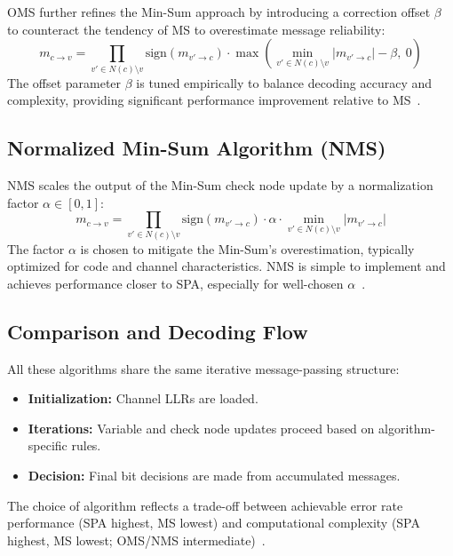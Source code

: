 \documentclass[../main.tex]{subfiles}
\begin{document}
OMS further refines the Min-Sum approach by introducing a correction offset $\beta$ to counteract the tendency of MS to overestimate message reliability:
\begin{equation}
    m_{c \to v} = \prod_{v' \in N(c) \setminus v} \mathrm{sign}(m_{v' \to c}) \cdot \max\left( \min_{v' \in N(c) \setminus v} |m_{v' \to c}| - \beta,\ 0 \right)
\end{equation}
The offset parameter $\beta$ is tuned empirically to balance decoding accuracy and complexity, providing significant performance improvement relative to MS~\cite{Condo2019}.


\subsection{Normalized Min-Sum Algorithm (NMS)}

NMS scales the output of the Min-Sum check node update by a normalization factor $\alpha \in [0,1]$:
\begin{equation}
    m_{c \to v} = \prod_{v' \in N(c) \setminus v} \mathrm{sign}(m_{v' \to c}) \cdot \alpha \cdot \min_{v' \in N(c) \setminus v} |m_{v' \to c}|
\end{equation}
The factor $\alpha$ is chosen to mitigate the Min-Sum’s overestimation, typically optimized for code and channel characteristics. NMS is simple to implement and achieves performance closer to SPA, especially for well-chosen $\alpha$~\cite{Schmalen2021, Condo2019}.


\subsection{Comparison and Decoding Flow}

All these algorithms share the same iterative message-passing structure:
\begin{itemize}
    \item \textbf{Initialization:} Channel LLRs are loaded.
    \item \textbf{Iterations:} Variable and check node updates proceed based on algorithm-specific rules.
    \item \textbf{Decision:} Final bit decisions are made from accumulated messages.
\end{itemize}

The choice of algorithm reflects a trade-off between achievable error rate performance (SPA highest, MS lowest) and computational complexity (SPA highest, MS lowest; OMS/NMS intermediate)~\cite{Schmalen2021, Condo2019}.
\end{document}
